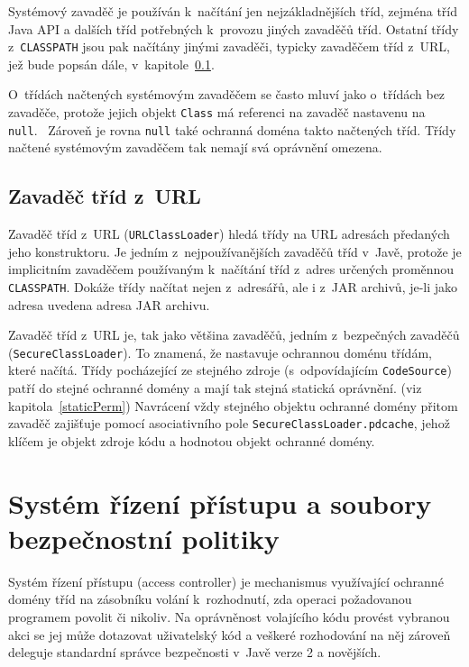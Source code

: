 Systémový zavaděč je používán k~načítání jen nejzákladnějších tříd, zejména tříd Java API a dalších tříd potřebných k~provozu jiných zavaděčů tříd.
Ostatní třídy z~{\tt CLASSPATH} jsou pak načítány jinými zavaděči, typicky zavaděčem tříd z~URL, jež bude popsán dále, v~kapitole~\ref{URLClassLoader}.

O~třídách načtených systémovým zavaděčem se často mluví jako o~třídách bez zavaděče, protože jejich objekt {\tt Class} má referenci na zavaděč nastavenu na {\tt null}.~\cite{oaks} Zároveň je rovna {\tt null} také ochranná doména takto načtených tříd. Třídy načtené systémovým zavaděčem tak nemají svá oprávnění omezena.~\cite{oaks}

\subsection{Zavaděč tříd z~URL} \label{URLClassLoader}

Zavaděč tříd z~URL ({\tt URLClassLoader}) hledá třídy na URL adresách předaných jeho konstruktoru. Je jedním z~nejpoužívanějších zavaděčů tříd v~Javě,
protože je implicitním zavaděčem používaným k~načítání tříd z~adres určených proměnnou {\tt CLASSPATH}.
Dokáže třídy načítat nejen z~adresářů, ale i z~JAR archivů, je-li jako adresa uvedena adresa JAR archivu.~\cite{oaks}

Zavaděč tříd z~URL je, tak jako většina zavaděčů, jedním z~bezpečných zavaděčů ({\tt SecureClassLoader}).
To znamená, že nastavuje ochrannou doménu třídám, které načítá.
Třídy pocházející ze stejného zdroje (s~odpovídajícím {\tt CodeSource}) patří do stejné ochranné domény a mají tak stejná statická oprávnění.
(viz kapitola~\ref{staticPerm})
Navrácení vždy stejného objektu ochranné domény přitom zavaděč zajišťuje pomocí asociativního pole {\tt SecureClassLoader.pdcache},
jehož klíčem je objekt zdroje kódu a hodnotou objekt ochranné domény.
\cite{sourceSecureClassLoader}

\section{Systém řízení přístupu a soubory bezpečnostní politiky}

Systém řízení přístupu (access controller) je mechanismus využívající ochranné domény tříd na zásobníku volání k~rozhodnutí, zda operaci požadovanou programem povolit či nikoliv.
Na oprávněnost volajícího kódu provést vybranou akci se jej může dotazovat uživatelský kód a veškeré rozhodování na něj zároveň deleguje standardní správce bezpečnosti v~Javě verze 2 a novějších.~\cite{oaks}

